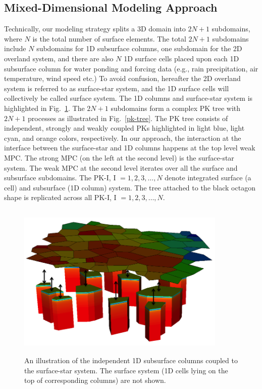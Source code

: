 \documentclass[review]{elsarticle}
\begin{document}
\subsection{Mixed-Dimensional Modeling Approach}
Technically, our modeling strategy splits a 3D domain into $2N+1$ subdomains, where $N$ is the total number of surface elements. The total $2N+1$ subdomains include $N$ subdomains for 1D subsurface columns, one subdomain for the 2D overland system, and there are also $N$ 1D surface cells placed upon each 1D subsurface column for water ponding and forcing data (e.g., rain precipitation, air temperature, wind speed etc.) To avoid confusion, hereafter the 2D overland system is referred to as surface-star system, and the 1D surface cells will collectively be called surface system. The 1D columns and surface-star system is highlighted in Fig.~\ref{surf-cols}. The $2N+1$ subdomains form a complex PK tree with $2N+1$ processes as illustrated in Fig.~\ref{pk-tree}. The PK tree consists of independent, strongly and weakly coupled PKs highlighted in light blue, light cyan, and orange colors, respectively. In our approach, the interaction at the interface between the surface-star and 1D columns happens at the top level weak MPC. The strong MPC (on the left at the second level) is the surface-star system. The weak MPC at the second level iterates over all the surface and subsurface subdomains. The PK-I, I $=1,2,3, \dots, N$ denote integrated surface (a cell) and subsurface (1D column) system. The tree attached to the black octagon shape is replicated across all PK-I, I $=1,2,3, \dots, N$.

\begin{figure}[!htpb]
\centering
\includegraphics[height = 7.5cm, width=10cm]{figures/mixed-dim-model.png}
\caption{An illustration of the independent 1D subsurface columns coupled to the surface-star system. The surface system (1D cells lying on the top of corresponding columns) are not shown.}
\label{surf-cols}
\end{figure}
\end{document}

